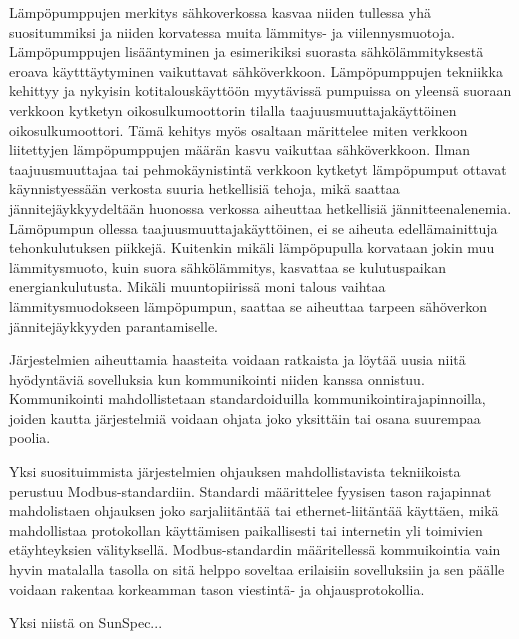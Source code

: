 Lämpöpumppujen merkitys sähkoverkossa kasvaa niiden tullessa yhä suositummiksi ja niiden korvatessa muita lämmitys- ja viilennysmuotoja. Lämpöpumppujen lisääntyminen ja esimerikiksi suorasta sähkölämmityksestä eroava käytttäytyminen vaikuttavat sähköverkkoon. Lämpöpumppujen tekniikka kehittyy ja nykyisin kotitalouskäyttöön myytävissä pumpuissa on yleensä suoraan verkkoon kytketyn oikosulkumoottorin tilalla taajuusmuuttajakäyttöinen oikosulkumoottori. Tämä kehitys myös osaltaan märittelee miten verkkoon liitettyjen lämpöpumppujen määrän kasvu vaikuttaa sähköverkkoon. Ilman taajuusmuuttajaa tai pehmokäynistintä verkkoon kytketyt lämpöpumput ottavat käynnistyessään verkosta suuria hetkellisiä tehoja, mikä saattaa jännitejäykkyydeltään huonossa verkossa aiheuttaa hetkellisiä jännitteenalenemia. Lämöpumpun ollessa taajuusmuuttajakäyttöinen, ei se aiheuta edellämainittuja tehonkulutuksen piikkejä. Kuitenkin mikäli lämpöpupulla korvataan jokin muu lämmitysmuoto, kuin suora sähkölämmitys, kasvattaa se kulutuspaikan energiankulutusta. Mikäli muuntopiirissä moni talous vaihtaa lämmitysmuodokseen lämpöpumpun, saattaa se aiheuttaa tarpeen sähöverkon jännitejäykkyyden parantamiselle.

Järjestelmien aiheuttamia haasteita voidaan ratkaista ja löytää uusia niitä hyödyntäviä sovelluksia kun kommunikointi niiden kanssa onnistuu. Kommunikointi mahdollistetaan standardoiduilla kommunikointirajapinnoilla, joiden kautta järjestelmiä voidaan ohjata joko yksittäin tai osana suurempaa poolia.

Yksi suosituimmista järjestelmien ohjauksen mahdollistavista tekniikoista perustuu Modbus-standardiin. Standardi määrittelee fyysisen tason rajapinnat mahdolistaen ohjauksen joko sarjaliitäntää tai ethernet-liitäntää käyttäen, mikä mahdollistaa protokollan käyttämisen paikallisesti tai internetin yli toimivien etäyhteyksien välityksellä. Modbus-standardin määritellessä kommuikointia vain hyvin matalalla tasolla on sitä helppo soveltaa erilaisiin sovelluksiin ja sen päälle voidaan rakentaa korkeamman tason viestintä- ja ohjausprotokollia.

Yksi niistä on SunSpec...
